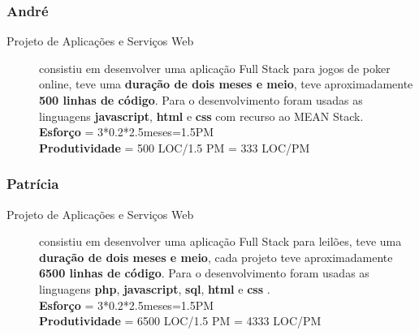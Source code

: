 \documentclass[a4paper]{report}
\begin{document}
\subsubsection*{André}
\begin{description}
    \item[Projeto de Aplicações e Serviços Web] consistiu em desenvolver uma aplicação Full Stack para jogos de poker online, teve uma \textbf{duração de dois meses e meio}, teve aproximadamente \textbf{500 linhas de código}. Para o desenvolvimento foram usadas as linguagens \textbf{javascript}, \textbf{html} e \textbf{css} com recurso ao MEAN Stack.\\\textbf{Esforço} = 3*0.2*2.5meses=1.5PM\\ \textbf{Produtividade} = 500 LOC/1.5 PM = 333 LOC/PM
\end{description}

\subsubsection*{Patrícia}
\begin{description}
    \item[Projeto de Aplicações e Serviços Web] consistiu em desenvolver uma aplicação Full Stack para leilões, teve uma \textbf{duração de dois meses e meio}, cada projeto teve aproximadamente \textbf{6500 linhas de código}. Para o desenvolvimento foram usadas as linguagens \textbf{php}, \textbf{javascript}, \textbf{sql}, \textbf{html} e \textbf{css} .\\\textbf{Esforço} = 3*0.2*2.5meses=1.5PM\\ \textbf{Produtividade} = 6500 LOC/1.5 PM = 4333 LOC/PM
\end{description}
\end{document}
